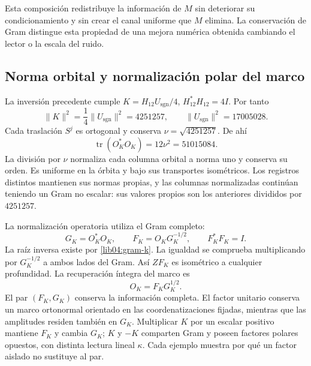 Esta composición redistribuye la información de \(M\) sin deteriorar
su condicionamiento y sin crear el canal uniforme que \(M\) elimina.
La conservación de Gram distingue esta propiedad de una mejora
numérica obtenida cambiando el lector o la escala del ruido.

\subsection{Norma orbital y normalización polar del marco}
\label{lib04:normalizacion}

La inversión precedente cumple
\(K=H_{12}U_{\mathrm{sgn}}/4\),
\(H_{12}^*H_{12}=4I\). Por tanto
\begin{equation}
 \|K\|^2=\frac14\|U_{\mathrm{sgn}}\|^2=4251257,
 \qquad \|U_{\mathrm{sgn}}\|^2=17005028.
 \label{lib04:norma-k}
\end{equation}
Cada traslación \(S^j\) es ortogonal y conserva
\(\nu=\sqrt{4251257}\). De ahí
\begin{equation}
 \operatorname{tr}(O_K^*O_K)=12\nu^2=51015084.
 \label{lib04:traza-marco}
\end{equation}
La división por \(\nu\) normaliza cada columna orbital a norma
uno y conserva su orden. Es uniforme en la órbita y bajo sus
transportes isométricos. Los registros distintos mantienen sus normas
propias, y las columnas normalizadas continúan teniendo un Gram
no escalar: sus valores propios son los anteriores divididos por
\(4251257\).

La normalización operatoria utiliza el Gram completo:
\begin{equation}
 G_K=O_K^*O_K,\qquad
 F_K=O_KG_K^{-1/2},\qquad
 F_K^*F_K=I.
 \label{lib04:polar}
\end{equation}
La raíz inversa existe por \eqref{lib04:gram-k}. La igualdad se
comprueba multiplicando por \(G_K^{-1/2}\) a ambos lados del Gram.
Así \(ZF_K\) es isométrico a cualquier profundidad.
La recuperación íntegra del marco es
\begin{equation}
 O_K=F_KG_K^{1/2}.
 \label{lib04:polar-inversa}
\end{equation}
El par \((F_K,G_K)\) conserva la información completa.
El factor unitario conserva un marco ortonormal orientado en las
coordenatizaciones fijadas, mientras que las amplitudes residen también en
\(G_K\). Multiplicar \(K\) por un escalar positivo mantiene
\(F_K\) y cambia \(G_K\); \(K\) y \(-K\) comparten
Gram y poseen factores polares opuestos, con distinta lectura lineal
\(\kappa\). Cada ejemplo muestra por qué un factor aislado no
sustituye al par.

